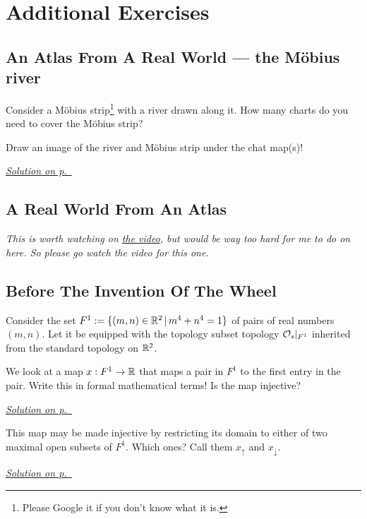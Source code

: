 \section{Additional Exercises}

\subsection{An Atlas From A Real World --- the M\"{o}bius river}

\begin{exercise}\label{ex:topologicalmfds-1}
Consider a M\"{o}bius strip\footnote{Please Google it if you don't know what it is.} with a river drawn along it. How many charts do you need to cover the M\"{o}bius strip?

Draw an image of the river and M\"{o}bius strip under the chat map(s)!
\end{exercise}
\hyperref[sol:topologicalmfds-1]{\small \textit{Solution on p.~\pageref*{sol:topologicalmfds-1}}}

\subsection{A Real World From An Atlas}

\textit{This is worth watching on \href{https://www.youtube.com/watch?v=ghfEQ3u_B6g&list=PLFeEvEPtX_0RQ1ys-7VIsKlBWz7RX-FaL&index=2}{the video}, but would be way too hard for me to do on here. So please go watch the video for this one.}

\subsection{Before The Invention Of The Wheel}

\begin{exercise}\label{ex:topologicalmfds-2}
Consider the set $F^1:= \{(m,n)\in\mathbb{R}^2 \, | \, m^4 + n^4 = 1\}$ of pairs of real numbers $(m,n)$. Let it be equipped with the topology subset topology $\mathcal{O}_{s}|_{F^1}$ inherited from the standard topology on $\mathbb{R}^2$.

We look at a map $x:F^1\to \mathbb{R}$ that maps a pair in $F^1$ to the first entry in the pair. Write this in formal mathematical terms! Is the map injective?
\end{exercise}
\hyperref[sol:topologicalmfds-2]{\small \textit{Solution on p.~\pageref*{sol:topologicalmfds-2}}}

\begin{exercise}\label{ex:topologicalmfds-3}
This map may be made injective by restricting its domain to either of two maximal open subsets of $F^1$. Which ones? Call them $x_{\uparrow}$ and $x_{\downarrow}$.
\end{exercise}
\hyperref[sol:topologicalmfds-3]{\small \textit{Solution on p.~\pageref*{sol:topologicalmfds-3}}}


